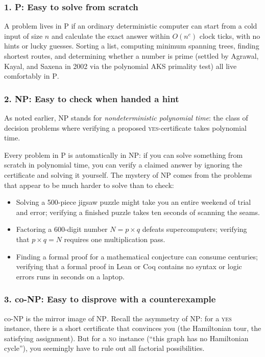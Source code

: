 \subsubsection{1. P: Easy to solve from scratch}
A problem lives in $\mathrm{P}$ if an ordinary deterministic computer can start from a cold input of size $n$ and calculate the exact answer within $O(n^c)$ clock ticks, with no hints or lucky guesses. Sorting a list, computing minimum spanning trees, finding shortest routes, and determining whether a number is prime (settled by Agrawal, Kayal, and Saxena in 2002 via the polynomial AKS primality test) all live comfortably in $\mathrm{P}$.

\subsubsection{2. NP: Easy to check when handed a hint}
As noted earlier, $\mathrm{NP}$ stands for \emph{nondeterministic polynomial time}: the class of decision problems where verifying a proposed \textsc{yes}-certificate takes polynomial time.

Every problem in $\mathrm{P}$ is automatically in $\mathrm{NP}$: if you can solve something from scratch in polynomial time, you can verify a claimed answer by ignoring the certificate and solving it yourself. The mystery of $\mathrm{NP}$ comes from the problems that appear to be much harder to solve than to check:
\begin{itemize}
  \item Solving a 500-piece jigsaw puzzle might take you an entire weekend of trial and error; verifying a finished puzzle takes ten seconds of scanning the seams.
  \item Factoring a 600-digit number $N = p \times q$ defeats supercomputers; verifying that $p \times q = N$ requires one multiplication pass.
  \item Finding a formal proof for a mathematical conjecture can consume centuries; verifying that a formal proof in Lean or Coq contains no syntax or logic errors runs in seconds on a laptop.
\end{itemize}

\subsubsection{3. co-NP: Easy to disprove with a counterexample}
$\mathrm{co\text{-}NP}$ is the mirror image of $\mathrm{NP}$.
Recall the asymmetry of $\mathrm{NP}$: for a \textsc{yes} instance, there is a short certificate that convinces you (the Hamiltonian tour, the satisfying assignment). But for a \textsc{no} instance (``this graph has no Hamiltonian cycle''), you seemingly have to rule out all factorial possibilities.

